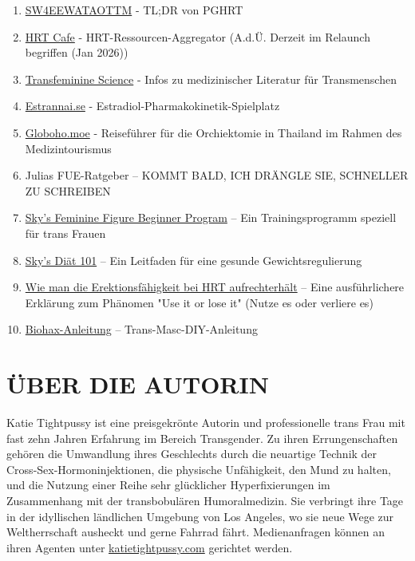 \documentclass{article}
\begin{document}
\begin{enumerate}
  \item \href{https://startwith4mgestradiolenanthateweeklyandtestatonetothreemonths.com/}{SW4EEWATAOTTM} - TL;DR von PGHRT
  \item \href{https://web.archive.org/web/20260310142419/https://hrtcafe.net/}{HRT Cafe} - HRT-Ressourcen-Aggregator (A.d.Ü. Derzeit im Relaunch begriffen (Jan 2026))
  \item \href{https://transfemscience.org/}{Transfeminine Science} - Infos zu medizinischer Literatur für Transmenschen
  \item \href{https://estrannai.se}{Estrannai.se} - Estradiol-Pharmakokinetik-Spielplatz
  \item \href{https://globoho.moe/}{Globoho.moe} - Reiseführer für die Orchiektomie in Thailand im Rahmen des Medizintourismus
  \item Julias FUE-Ratgeber – KOMMT BALD, ICH DRÄNGLE SIE, SCHNELLER ZU SCHREIBEN
  \item \href{https://docs.google.com/document/d/1-NyE5EY5TTaRRMhk7HlTbKJ7HifjEsA4jlDO1qKQVl0/edit?tab=t.0}{Sky's Feminine Figure Beginner Program} – Ein Trainingsprogramm speziell für trans Frauen
  \item \href{https://docs.google.com/document/d/114sztSw1aVWM2pXLDl9NrHklyvewz3EmFiHiisjM71k/edit?tab=t.0}{Sky's Diät 101} – Ein Leitfaden für eine gesunde Gewichtsregulierung
  \item \href{https://stainedglasswoman.substack.com/p/how-to-maintain-your-penis-function}{Wie man die Erektionsfähigkeit bei HRT aufrechterhält} – Eine ausführlichere Erklärung zum Phänomen "Use it or lose it" (Nutze es oder verliere es)
  \item \href{https://mega.nz/folder/cfwSmBbY#ify6kaueB8SdDD1v12t2Dw}{Biohax-Anleitung} – Trans-Masc-DIY-Anleitung
\end{enumerate}

\section*{ÜBER DIE AUTORIN}

Katie Tightpussy ist eine preisgekrönte Autorin und professionelle trans Frau mit fast zehn Jahren Erfahrung im Bereich Transgender. Zu ihren Errungenschaften gehören die Umwandlung ihres Geschlechts durch die neuartige Technik der Cross-Sex-Hormoninjektionen, die physische Unfähigkeit, den Mund zu halten, und die Nutzung einer Reihe sehr glücklicher Hyperfixierungen im Zusammenhang mit der transbobulären Humoralmedizin. Sie verbringt ihre Tage in der idyllischen ländlichen Umgebung von Los Angeles, wo sie neue Wege zur Weltherrschaft ausheckt und gerne Fahrrad fährt. Medienanfragen können an ihren Agenten unter \href{http://katietightpussy.com}{katietightpussy.com} gerichtet werden.
\end{document}
